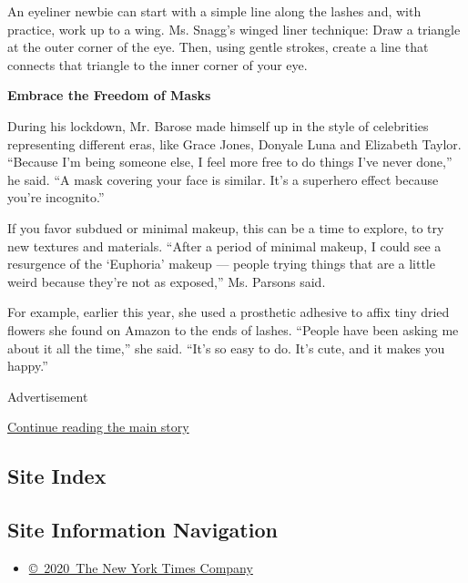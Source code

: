 An eyeliner newbie can start with a simple line along the lashes and,
with practice, work up to a wing. Ms. Snagg's winged liner technique:
Draw a triangle at the outer corner of the eye. Then, using gentle
strokes, create a line that connects that triangle to the inner corner
of your eye.

\textbf{Embrace the Freedom of Masks}

During his lockdown, Mr. Barose made himself up in the style of
celebrities representing different eras, like Grace Jones, Donyale Luna
and Elizabeth Taylor. ``Because I'm being someone else, I feel more free
to do things I've never done,'' he said. ``A mask covering your face is
similar. It's a superhero effect because you're incognito.''

If you favor subdued or minimal makeup, this can be a time to explore,
to try new textures and materials. ``After a period of minimal makeup, I
could see a resurgence of the `Euphoria' makeup --- people trying things
that are a little weird because they're not as exposed,'' Ms. Parsons
said.

For example, earlier this year, she used a prosthetic adhesive to affix
tiny dried flowers she found on Amazon to the ends of lashes. ``People
have been asking me about it all the time,'' she said. ``It's so easy to
do. It's cute, and it makes you happy.''

Advertisement

\protect\hyperlink{after-bottom}{Continue reading the main story}

\hypertarget{site-index}{%
\subsection{Site Index}\label{site-index}}

\hypertarget{site-information-navigation}{%
\subsection{Site Information
Navigation}\label{site-information-navigation}}

\begin{itemize}
\tightlist
\item
  \href{https://help.nytimes.com/hc/en-us/articles/115014792127-Copyright-notice}{©~2020~The
  New York Times Company}
\end{itemize}

